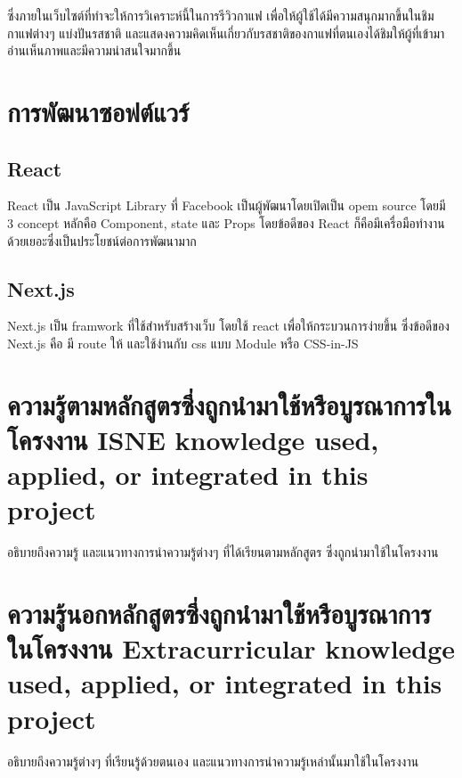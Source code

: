 ซึ่งภายในเว็บไซต์ที่ทำจะให้การวิเคราะห์นี้ในการรีวิวกาแฟ เพื่อให้ผู้ใช้ได้มีความสนุกมากขึ้นในชิมกาแฟต่างๆ แบ่งปันรสชาติ และแสดงความคิดเห็นเกี่ยวกับรสชาติของกาแฟที่ตนเองได้ชิมให้ผู้ที่เข้ามาอ่านเห็นภาพและมีความน่าสนใจมากขึ้น

\section{การพัฒนาซอฟต์แวร์}
\subsection{React}
React เป็น JavaScript Library ที่ Facebook เป็นผู้พัฒนาโดยเปิดเป็น opem source โดยมี 3 concept หลักคือ Component, state และ Props โดยข้อดีของ React ก็คือมีเครื่อมือทำงานด้วยเยอะซึ่งเป็นประโยชน์ต่อการพัฒนามาก

\subsection{Next.js}
Next.js เป็น framwork ที่ใช้สำหรับสร้างเว็บ โดยใช้ react เพื่อให้กระบวนการง่ายขึ้น ซึ่งข้อดีของ Next.js คือ มี route ให้ และใช้ง่านกับ css แบบ Module หรือ CSS-in-JS


\section{\ifcpe%
ความรู้ตามหลักสูตรซึ่งถูกนำมาใช้หรือบูรณาการในโครงงาน
\else%
ISNE knowledge used, applied, or integrated in this project
\fi
}

อธิบายถึงความรู้ และแนวทางการนำความรู้ต่างๆ ที่ได้เรียนตามหลักสูตร ซึ่งถูกนำมาใช้ในโครงงาน

\section{\ifcpe%
ความรู้นอกหลักสูตรซึ่งถูกนำมาใช้หรือบูรณาการในโครงงาน
\else%
Extracurricular knowledge used, applied, or integrated in this project
\fi
}

อธิบายถึงความรู้ต่างๆ ที่เรียนรู้ด้วยตนเอง และแนวทางการนำความรู้เหล่านั้นมาใช้ในโครงงาน
